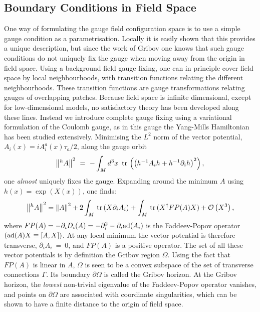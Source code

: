 \documentclass[12pt]{book}
\newcommand{\beq}{\begin{equation}}
\newcommand{\eeq}{\end{equation}}
\newcommand{\ad}{{\rm ad}}
\newcommand{\norm}[1]{\left\| #1 \right\|}
\newcommand{\tr}{\mbox{\,tr\,}}
\newcommand{\Ss}[1]{\mbox{$\cal #1$}}
\newcommand{\pr}{\partial}
\newcommand{\Order}[1]{\Ss{O}\left(#1\right)}
\newcommand{\site}[1]{\refnote{\cite{#1}}}
\begin{document}
\subsection{Boundary Conditions in Field Space}
One way of formulating the gauge field configuration space is to use a simple
gauge condition as a parametrisation. Locally it is easily shown that this 
provides a unique description, but since the work of Gribov\site{grib} one 
knows that such gauge conditions do not uniquely fix the gauge when moving 
away from the origin in field space. Using a background field gauge fixing, 
one can in principle cover field space by local neighbourhoods, with transition 
functions relating the different neighbourhoods\site{nahm}. These transition 
functions are gauge transformations relating gauges of overlapping 
patches\site{vba2}. Because field space is infinite dimensional, except for 
low-dimensional models, no satisfactory theory has been developed along these 
lines. Instead we introduce complete gauge fixing using a variational 
formulation of the Coulomb gauge\site{sefr}, as in this gauge the Yang-Mills 
Hamiltonian has been studied extensively\site{chle}. Minimising the $L^2$ norm
of the vector potential, $A_i(x)=iA^a_i(x)\tau_a/2$, along the gauge orbit
\beq
\norm{^h A}^2~=~ -\int_M d^3x~
\tr \left( \left( h^{-1} A_i h + h^{-1} \pr_i h \right)^2\right),
\label{gAnorm}
\end{equation}
one {\em almost} uniquely fixes the gauge. 
Expanding around the minimum $A$ using $h(x)=\exp(X(x))$, one finds:
\beq
\norm{^h A}^2 = \norm{A}^2+2\int_M \tr(X
\partial_i A_i)+\int_M \tr (X^\dagger FP (A) X)+\Order{X^3},
\label{Xexpansie}
\eeq
where $FP(A)=-\partial_i D_i (A)=-\partial^2_i-\partial_i\ad(A_i)$ is the 
Faddeev-Popov operator $(\ad(A)X\equiv[A,X])$. At any local minimum the 
vector potential is therefore transverse, $\partial_i A_i~=~0$, and $FP(A)$ 
is a positive operator. The set of all these vector potentials is by definition
the Gribov region $\Omega$. Using the fact that $FP(A)$ is linear in $A$, 
$\Omega$ is seen to be a convex subspace of the set of transverse connections 
$\Gamma$. Its boundary $\partial \Omega$ is called the Gribov horizon. At the 
Gribov horizon, the {\em lowest} non-trivial eigenvalue of the Faddeev-Popov 
operator vanishes, and points on $\partial\Omega$ are associated with 
coordinate singularities, which can be shown to have a finite distance 
to the origin of field space\site{dezw}. 
\end{document}
